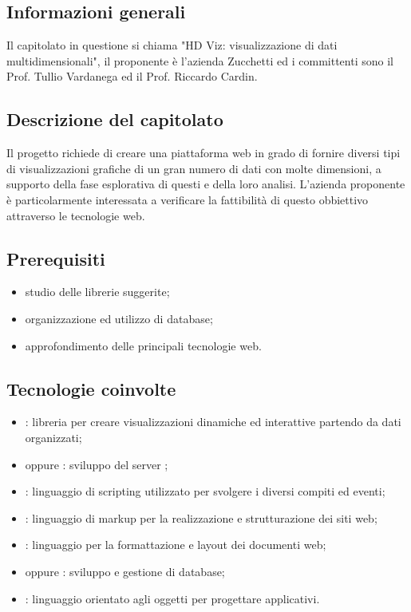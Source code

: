 
\subsection{Informazioni generali}
Il capitolato in questione si chiama "HD Viz: visualizzazione di dati multidimensionali", il proponente è l'azienda Zucchetti ed i committenti sono il Prof. Tullio Vardanega ed il Prof. Riccardo Cardin.

\subsection{Descrizione del capitolato}
Il progetto richiede di creare una piattaforma web in grado di fornire diversi tipi di visualizzazioni grafiche di un gran numero di dati con molte dimensioni, a supporto della fase esplorativa di questi e della loro analisi. 
L’azienda proponente è particolarmente interessata a verificare la fattibilità di questo obbiettivo attraverso le tecnologie web.

\subsection{Prerequisiti}
\begin{itemize}
\item studio delle librerie suggerite;
\item organizzazione ed utilizzo di database;
\item approfondimento delle principali tecnologie web.
\end{itemize}

\subsection{Tecnologie coinvolte}
\begin{itemize}
\item {}: libreria  per creare visualizzazioni dinamiche ed interattive partendo da dati organizzati;
\item {} oppure : sviluppo del server ;
\item {}: linguaggio di scripting utilizzato per svolgere i diversi compiti ed eventi;
\item {}: linguaggio di markup per la realizzazione e strutturazione dei siti web;
\item {}: linguaggio per la formattazione e layout dei documenti web;
\item {} oppure : sviluppo e gestione di database;
\item {}: linguaggio orientato agli oggetti per progettare applicativi.
\end{itemize}

